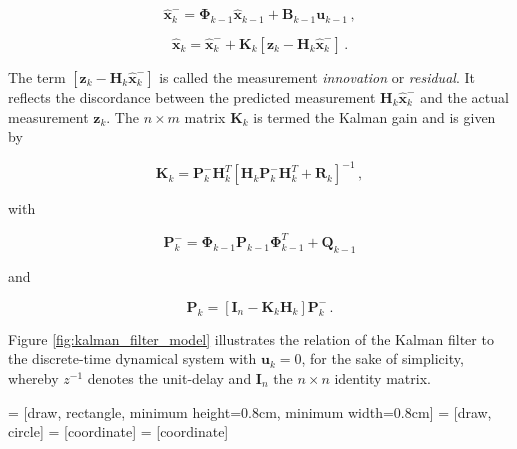 \begin{equation}\label{eq:apriori_estimate}
  \hat{\mathbf{x}}^-_k = \bm{\Phi}_{k-1}\hat{\mathbf{x}}_{k-1}+\mathbf{B}_{k-1}\mathbf{u}_{k-1}\,,
\end{equation}

\begin{equation}\label{eq:aposteriori_estimate}
  \hat{\mathbf{x}}_k = \hat{\mathbf{x}}^-_k + \mathbf{K}_{k}[\mathbf{z}_k-\mathbf{H}_{k}\hat{\mathbf{x}}^-_k]\,.
\end{equation}

\noindent
The term $[\mathbf{z}_k-\mathbf{H}_{k}\hat{\mathbf{x}}^-_k]$ is called the measurement \emph{innovation} or \emph{residual}. It reflects the discordance between the predicted measurement $\mathbf{H}_{k}\hat{\mathbf{x}}^-_k$ and the actual measurement $\mathbf{z}_k$. The $n\times m$ matrix $\mathbf{K}_{k}$ is termed the Kalman gain and is given by

\begin{equation}\label{eq:Kalman_gain}
  \mathbf{K}_{k} = \mathbf{P}^-_k \mathbf{H}^T_k[\mathbf{H}_k \mathbf{P}^-_k \mathbf{H}^T_k + \mathbf{R}_k]^{-1}\,,
\end{equation}

\noindent
with

\begin{equation}\label{eq:apriori_error_cov}
  \mathbf{P}^-_{k} = \bm{\Phi}_{k-1} \mathbf{P}_{k-1} \bm{\Phi}^T_{k-1} + \mathbf{Q}_{k-1}
\end{equation}

\noindent
and

\begin{equation}\label{eq:aposteriori_error_cov}
  \mathbf{P}_{k} = [\mathbf{I}_n - \mathbf{K}_{k}\mathbf{H}_{k}]\mathbf{P}^-_{k}\,.
\end{equation}

\noindent
Figure \ref{fig:kalman_filter_model} illustrates the relation of the Kalman filter to the discrete-time dynamical system with $\mathbf{u}_{k}=0$, for the sake of simplicity, whereby $z^{-1}$ denotes the unit-delay and $\mathbf{I}_n$ the $n\times n$ identity matrix.

 = [draw, rectangle, minimum height=0.8cm, minimum width=0.8cm]
 = [draw, circle]
 = [coordinate]
 = [coordinate]

